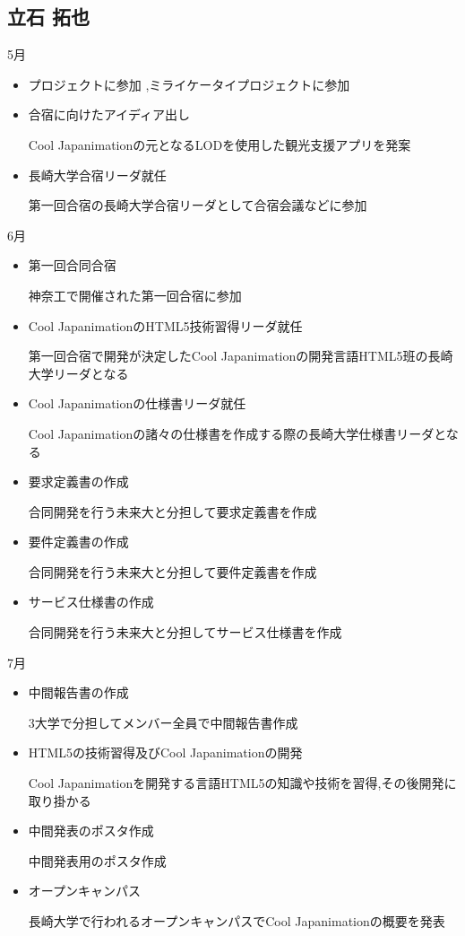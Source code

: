 \subsection{立石 拓也}
5月
\begin{itemize}
\item プロジェクトに参加
,ミライケータイプロジェクトに参加
\item 合宿に向けたアイディア出し
\par Cool Japanimationの元となるLODを使用した観光支援アプリを発案
\item 長崎大学合宿リーダ就任
\par 第一回合宿の長崎大学合宿リーダとして合宿会議などに参加
\end{itemize}
6月
\begin{itemize}
\item 第一回合同合宿
\par 神奈工で開催された第一回合宿に参加
\item Cool JapanimationのHTML5技術習得リーダ就任
\par 第一回合宿で開発が決定したCool Japanimationの開発言語HTML5班の長崎大学リーダとなる
\item Cool Japanimationの仕様書リーダ就任
\par Cool Japanimationの諸々の仕様書を作成する際の長崎大学仕様書リーダとなる
\item 要求定義書の作成
\par 合同開発を行う未来大と分担して要求定義書を作成
\item 要件定義書の作成
\par 合同開発を行う未来大と分担して要件定義書を作成
\item サービス仕様書の作成
\par 合同開発を行う未来大と分担してサービス仕様書を作成
\end{itemize}
7月
\begin{itemize}
\item 中間報告書の作成
\par 3大学で分担してメンバー全員で中間報告書作成
\item HTML5の技術習得及びCool Japanimationの開発
\par Cool Japanimationを開発する言語HTML5の知識や技術を習得,その後開発に取り掛かる
\item 中間発表のポスタ作成
\par 中間発表用のポスタ作成
\item オープンキャンパス
\par 長崎大学で行われるオープンキャンパスでCool Japanimationの概要を発表
\end{itemize}
